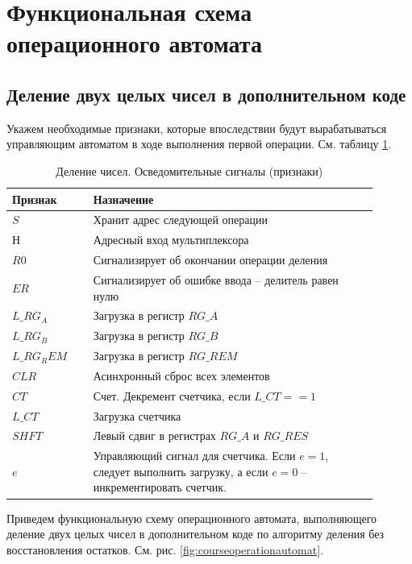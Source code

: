 \documentclass[a4paper,14pt]{extarticle}
\begin{document}
\fi


\section{Функциональная схема операционного автомата}
\subsection{Деление двух целых чисел в дополнительном коде}

Укажем необходимые признаки, которые впоследствии будут вырабатываться управляющим автоматом в ходе выполнения первой операции. См. таблицу \ref{tab:signalsop1}.
\begin{table}[h!]
	\small
	\centering
	\begin{tabular}{|m{0.2\linewidth}|m{0.7\linewidth}|}
		\hline
		\textbf{Признак} & \textbf{Назначение} \\ \hline
		$S$ & Хранит адрес следующей операции \\ \hline
		$Н$ & Адресный вход мультиплексора \\ \hline
		$R0$ & Сигнализирует об окончании операции деления \\ \hline
		$ER$ & Сигнализирует об ошибке ввода -- делитель равен нулю \\ \hline
		$L\_RG_A$ & Загрузка в регистр $RG\_A$ \\ \hline
		$L\_RG_B$ & Загрузка в регистр $RG\_B$ \\ \hline
		$L\_RG_REM$ & Загрузка в регистр $RG\_REM$ \\ \hline
		$CLR$ & Асинхронный сброс всех элементов \\ \hline
		$CT$ & Счет. Декремент счетчика, если $L\_CT==1$ \\ \hline
		$L\_CT$ & Загрузка счетчика \\ \hline
		$SHFT$ & Левый сдвиг в регистрах $RG\_A \text{ и } RG\_RES$ \\ \hline
		$e$ & Управляющий сигнал для счетчика. Если $e=1$, следует выполнить загрузку, а если $e=0$ -- инкрементировать счетчик. \\ \hline
	\end{tabular}
	\caption{Деление чисел. Осведомительные сигналы (признаки)}
	\label{tab:signalsop1}
\end{table}



Приведем функциональную схему операционного автомата, выполняющего деление двух целых чисел в дополнительном коде по алгоритму деления без восстановления остатков. См. рис. \ref{fig:courseoperationautomat}.
\end{document}
